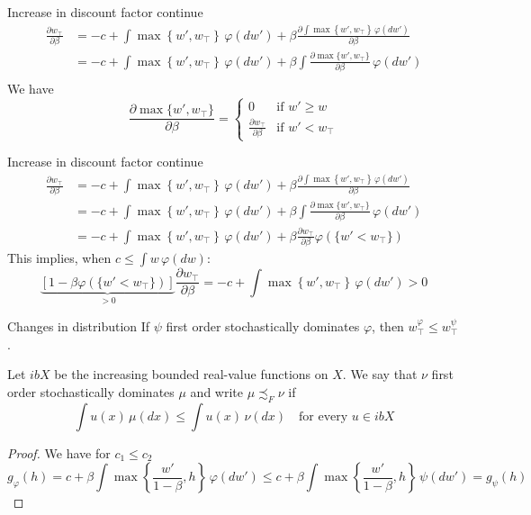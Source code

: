 \begin{frame}{Increase in discount factor continue}
\begin{align*}
    \frac{\partial w_\top}{\partial \beta} &= -c+\int \max\left\{w', w_\top\right\}\, \varphi(dw') + \beta \frac{\partial \int \max\left\{w', w_\top\right\}\, \varphi(dw')}{\partial \beta}\\
    &= -c+\int \max\left\{w', w_\top\right\}\, \varphi(dw') + \beta \int\frac{\partial \max\{w',w_\top\}}{\partial \beta}\,\varphi(dw')\\
\end{align*}
We have 
$$
\frac{\partial \max\{w',w_\top\}}{\partial \beta} = \begin{cases}
    0 &\text{if $w'\ge w$}\\
    \frac{\partial w_\top}{\partial\beta} &\text{if $w'<w_\top$}
\end{cases}
$$
\end{frame}

\begin{frame}{Increase in discount factor continue}
    \begin{align*}
    \frac{\partial w_\top}{\partial \beta} &= -c+\int \max\left\{w', w_\top\right\}\, \varphi(dw') + \beta \frac{\partial \int \max\left\{w', w_\top\right\}\, \varphi(dw')}{\partial \beta}\\
    &= -c+\int \max\left\{w', w_\top\right\}\, \varphi(dw') + \beta \int\frac{\partial \max\{w',w_\top\}}{\partial \beta}\,\varphi(dw')\\
    &= -c+\int \max\left\{w', w_\top\right\}\, \varphi(dw') + \beta \frac{\partial w_\top}{\partial \beta}\varphi(\{w'<w_\top\})
\end{align*}
This implies, when $c\le \int w\,\varphi(dw)$:
$$
\underbrace{[1-\beta \varphi(\{w'<w_\top\})]}_{>0}\frac{\partial w_\top}{\partial \beta}=-c+\int \max\left\{w', w_\top\right\}\, \varphi(dw')> 0
$$
\end{frame}

\begin{frame}{Changes in distribution}
If $\psi$ first order stochastically dominates $\varphi$, then $w_\top^\varphi\le w_\top^\psi$.
\begin{definition}
    Let $ibX$ be the increasing bounded real-value functions on $X$. We say that $\nu$ first order stochastically dominates $\mu$ and write $\mu\precsim_F \nu$ if 
    $$
    \int u(x)\,\mu(dx)\le \int u(x)\,\nu(dx)\quad\text{for every $u\in ibX$}
    $$
\end{definition}
\begin{proof}
     We have for $c_1\le c_2$
    $$
    g_\varphi(h) = c + \beta \int \max\left\{\frac{w'}{1-\beta}, h\right\}\,\varphi(dw')\le c+ \beta \int \max\left\{\frac{w'}{1-\beta}, h\right\}\,\psi(dw') = g_\psi(h)
    $$
\end{proof}
    
\end{frame}


